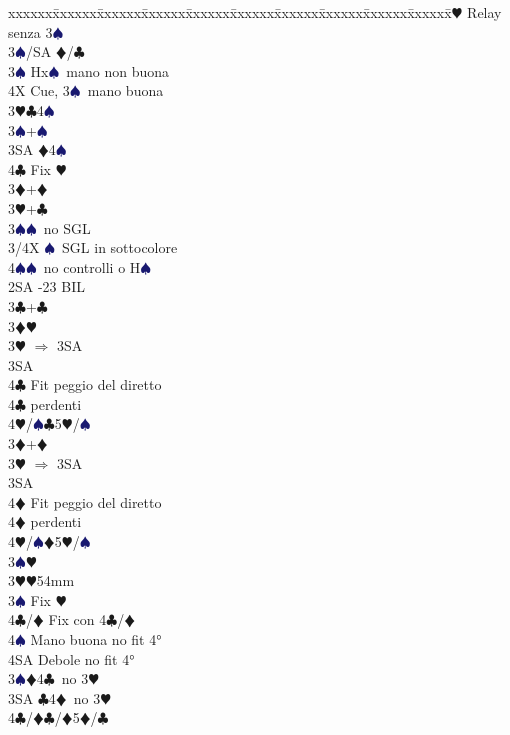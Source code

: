 \documentclass[a4paper,italian]{article}
\newcommand{\BC}{\textcolor{OliveGreen}{$\clubsuit$}}
\newcommand{\BD}{\textcolor{RedOrange}{$\vardiamondsuit$}}
\newcommand{\BH}{\textcolor{Red2}{$\varheartsuit${}}}
\newcommand{\BS}{\textcolor{MidnightBlue}{$\spadesuit${}}}
\newenvironment{bidtable}
{\begin{tabbing}

    xxxxxx\=xxxxxx\=xxxxxx\=xxxxxx\=xxxxxx\=xxxxxx\=xxxxxx\=xxxxxx\=xxxxxx\=xxxxxx\=\kill}
{\end{tabbing} }%
\begin{document}
\begin{multicols}{2}
\begin{bidtable}
        3\BH \> Relay senza 3\BS\+\\
        3\BS/SA \BD/\BC\-\\
        3\BS \> Hx\BS\ mano non buona\\
        4X \> Cue, 3\BS\ mano buona\-\\
        3\BH {}\BC 4\BS \\
        3\BS {}+\BS \\
        3SA \BD 4\BS \\
        4\BC \> Fix \BH \-\\
        3\BD {}+\BD \\
        3\BH {}+\BC \\
        3\BS {}\BS\ no SGL\\
        3/4X \BS\ SGL in sottocolore\\
        4\BS {}\BS\ no controlli o H\BS \-\\
        2SA -23 BIL\\
        3\BC {}+\BC \+\\
        3\BD {}\BH \\
        3\BH \> $\Rightarrow$ 3SA\+\\
        3SA\+\\
        4\BC \> Fit peggio del diretto\-\\
        4\BC {} perdenti\\
        4\BH/\BS {}\BC 5\BH /\BS \-\-\\
        3\BD {}+\BD \+\\
        3\BH \> $\Rightarrow$ 3SA\+\\
        3SA\+\\
        4\BD \> Fit peggio del diretto\-\\
        4\BD {} perdenti\\
        4\BH/\BS {}\BD 5\BH /\BS \-\\
        3\BS {}\BH \-\\
        3\BH {}\BH 54mm\+\\
        3\BS \> Fix \BH \\
        4\BC/\BD \> Fix con 4\BC/\BD\\
        4\BS \> Mano buona no fit 4°\\
        4SA \> Debole no fit 4°\-\\
        3\BS {}\BD 4\BC\ no 3\BH \\
        3SA \BC 4\BD\ no 3\BH \\
        4\BC/\BD {}\BC /\BD 5\BD /\BC\\

\end{bidtable}
\end{multicols}
\end{document}
